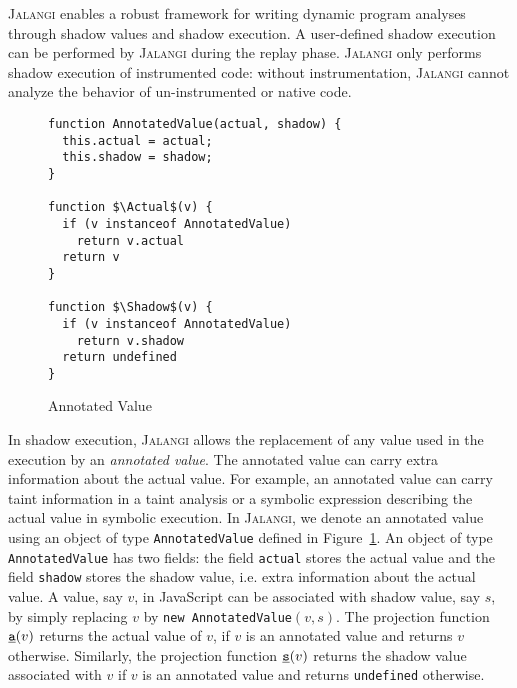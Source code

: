 \documentclass{sig-alternate}
\def\jalangi{\textsc{Jalangi}}
\newcommand \usl [1] {\mbox{\underline{\tt #1}}\xspace}
\newcommand \Actual{\usl{a}}
\newcommand \Shadow{\usl{s}}
\begin{document}
\jalangi{} enables a robust framework for writing dynamic program analyses
through shadow values and shadow execution.  A user-defined shadow
execution can be performed by \jalangi{} during the replay phase.
\jalangi{} only performs shadow execution of instrumented code:
without instrumentation, \jalangi{} cannot analyze the behavior of
un-instrumented or native code.

\lstset{language=JavaScript}
\begin{figure}
  
{\small 
\begin{lstlisting}[mathescape]
function AnnotatedValue(actual, shadow) {
  this.actual = actual;
  this.shadow = shadow;
}

function $\Actual$(v) {
  if (v instanceof AnnotatedValue)
    return v.actual
  return v
}

function $\Shadow$(v) {
  if (v instanceof AnnotatedValue)
    return v.shadow
  return undefined
}
\end{lstlisting}
}
  \caption{Annotated Value}
  \label{fig:annot}
\end{figure}

In shadow execution, \jalangi{} allows the replacement of any value
used in the execution by an \emph{annotated value}.  The annotated
value can carry extra information about the actual value.  For
example, an annotated value can carry taint information in a taint
analysis or a symbolic expression describing the actual value in
symbolic execution.  In \jalangi{}, we denote an annotated value using
an object of type \texttt{AnnotatedValue} defined in
Figure~\ref{fig:annot}.  An object of type \texttt{AnnotatedValue} has
two fields: the field \texttt{actual} stores the actual value and the
field \texttt{shadow} stores the shadow value, i.e. extra information
about the actual value.  A value, say $v$, in JavaScript can be
associated with shadow value, say $s$, by simply replacing $v$ by
\texttt{new AnnotatedValue}$(v, s)$.  The projection function
$\Actual(v)$ returns the actual value of $v$, if $v$ is an annotated
value and returns $v$ otherwise.  Similarly, the projection function
$\Shadow(v)$ returns the shadow value associated with $v$ if $v$ is an
annotated value and returns \texttt{undefined} otherwise.
\end{document}
